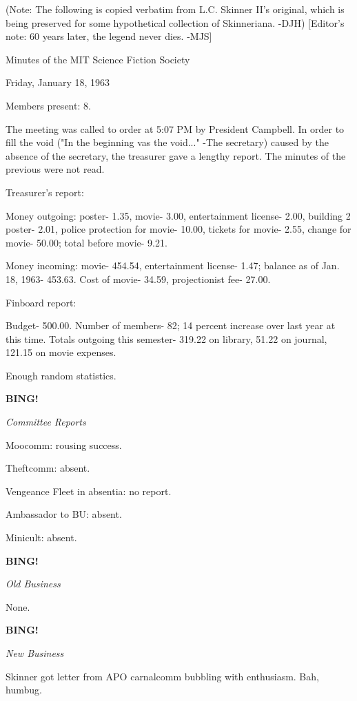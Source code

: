 \documentclass[12pt]{article}
\newcommand{\bing}{{\bf BING!} }
\newcommand{\goto}[1]{\bing \vskip 12pt \centerline{{\em{#1}}}}
\begin{document}
(Note: The following is copied verbatim from L.C. Skinner II's original, which is being preserved for some hypothetical collection of Skinneriana. -DJH) [Editor's note: 60 years later, the legend never dies. -MJS]

\begin{center}

Minutes of the MIT Science Fiction Society

Friday, January 18, 1963

\end{center}
 
\vspace{12pt}

\setlength{\parskip}{6pt}

\noindent
Members present: 8.

The meeting was called to order at 5:07 PM by President Campbell. In order to fill the void ("In the beginning vas the void..." -The secretary) caused by the absence of the secretary, the treasurer gave a lengthy report. The minutes of the previous were not read.

Treasurer's report:

Money outgoing: poster- 1.35, movie- 3.00, entertainment license- 2.00, building 2 poster- 2.01, police protection for movie- 10.00, tickets for movie- 2.55, change for movie- 50.00; total before movie- 9.21.

Money incoming: movie- 454.54, entertainment license- 1.47; balance as of Jan. 18, 1963- 453.63. Cost of movie- 34.59, projectionist fee- 27.00.

Finboard report:

Budget- 500.00. Number of members- 82; 14 percent increase over last year at this time. Totals outgoing this semester- 319.22 on library, 51.22 on journal, 121.15 on movie expenses.

Enough random statistics.

\goto{Committee Reports}

Moocomm: rousing success.

Theftcomm: absent.

Vengeance Fleet in absentia: no report.

Ambassador to BU: absent.

Minicult: absent.

\goto{Old Business}

None.

\goto{New Business}

Skinner got letter from APO carnalcomm bubbling with enthusiasm. Bah, humbug.
\end{document}
